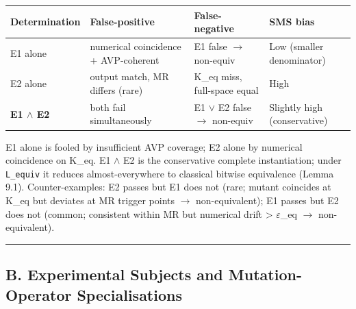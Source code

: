 \documentclass[review,12pt,authoryear]{elsarticle}
\newcounter{none}                   %
\begin{document}
{\def\LTcaptype{none} %
\begin{longtable}[]{@{}
  >{\raggedright\arraybackslash}p{}
  >{\raggedright\arraybackslash}p{}
  >{\raggedright\arraybackslash}p{}
  >{\raggedright\arraybackslash}p{}@{}}
\toprule\noalign{}
\begin{minipage}[b]{\linewidth}\raggedright
Determination
\end{minipage} & \begin{minipage}[b]{\linewidth}\raggedright
False-positive
\end{minipage} & \begin{minipage}[b]{\linewidth}\raggedright
False-negative
\end{minipage} & \begin{minipage}[b]{\linewidth}\raggedright
SMS bias
\end{minipage} \\
\midrule\noalign{}
\endhead
\bottomrule\noalign{}
\endlastfoot
E1 alone & numerical coincidence + AVP-coherent & E1 false $\to$ non-equiv &
Low (smaller denominator) \\
E2 alone & output match, MR differs (rare) & K\_eq miss, full-space
equal & High \\
\textbf{E1 $\wedge$ E2} & both fail simultaneously & E1 $\vee$ E2 false $\to$ non-equiv
& Slightly high (conservative) \\
\end{longtable}
}

E1 alone is fooled by insufficient AVP coverage; E2 alone by numerical
coincidence on K\_eq. E1 $\wedge$ E2 is the conservative complete
instantiation; under \texttt{L\_equiv} it reduces almost-everywhere to
classical bitwise equivalence (Lemma 9.1). Counter-examples: E2 passes
but E1 does not (rare; mutant coincides at K\_eq but deviates at MR
trigger points $\to$ non-equivalent); E1 passes but E2 does not (common;
consistent within MR but numerical drift \textgreater{} $\varepsilon$\_eq $\to$
non-equivalent).

\begin{center}\rule{0.5\linewidth}{0.5pt}\end{center}

\subsection{B. Experimental Subjects and Mutation-Operator
Specialisations}\label{b.-experimental-subjects-and-mutation-operator-specialisations}
\end{document}
